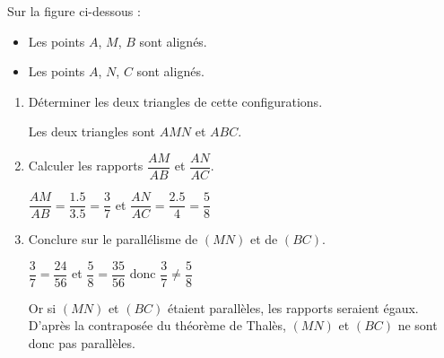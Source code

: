     \phantom{rrr}

    \begin{multicols}{2}
        Sur la figure ci-dessous :
        \begin{itemize}
            \item Les points $A$, $M$, $B$ sont alignés.
            \item Les points $A$, $N$, $C$ sont alignés.
        \end{itemize}
        \begin{spacing}{1.5}
            \begin{enumerate}
                \item Déterminer les deux triangles de cette configurations.

                {\color{red} Les deux triangles sont $AMN$ et $ABC$.}
                \columnbreak
                \item Calculer les rapports $\dfrac{AM}{AB}$ et $\dfrac{AN}{AC}$.

                {\color{red}
                $\dfrac{AM}{AB}=\dfrac{\num{1.5}}{\num{3.5}}=\dfrac{3}{7}$ et $\dfrac{AN}{AC}=\dfrac{\num{2.5}}{\num{4}}=\dfrac{5}{8}$
                }
                \item Conclure sur le parallélisme de $(MN)$ et de $(BC)$.

                {\color{red}
                $\dfrac{3}{7}=\dfrac{24}{56}$ et $\dfrac{5}{8}=\dfrac{35}{56}$ donc $\dfrac{3}{7}\neq\dfrac{5}{8}$

                Or si $(MN)$ et $(BC)$ étaient parallèles, les rapports seraient égaux.
                D'après la contraposée du théorème de Thalès, $(MN)$ et $(BC)$ ne sont donc pas parallèles.
                }
            \end{enumerate}
        \end{spacing}
    \end{multicols}
